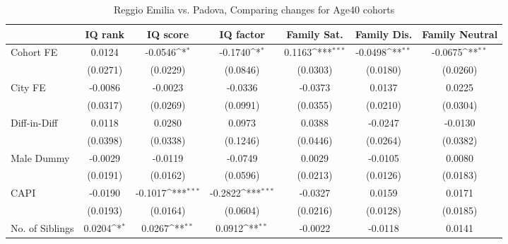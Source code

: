 \begin{table}[htbp]\centering
\def\sym#1{\ifmmode^{#1}\else\(^{#1}\)\fi}
\caption{Reggio Emilia vs. Padova, Comparing changes for Age40 cohorts}
\begin{tabular}{l*{6}{c}}
\toprule
            &\multicolumn{1}{c}{IQ rank}&\multicolumn{1}{c}{IQ score}&\multicolumn{1}{c}{IQ factor}&\multicolumn{1}{c}{Family Sat.}&\multicolumn{1}{c}{Family Dis.}&\multicolumn{1}{c}{Family Neutral}\\
\midrule
Cohort FE   &      0.0124         &     -0.0546\sym{*}  &     -0.1740\sym{*}  &      0.1163\sym{***}&     -0.0498\sym{**} &     -0.0675\sym{**} \\
            &    (0.0271)         &    (0.0229)         &    (0.0846)         &    (0.0303)         &    (0.0180)         &    (0.0260)         \\
\addlinespace
City FE     &     -0.0086         &     -0.0023         &     -0.0336         &     -0.0373         &      0.0137         &      0.0225         \\
            &    (0.0317)         &    (0.0269)         &    (0.0991)         &    (0.0355)         &    (0.0210)         &    (0.0304)         \\
\addlinespace
Diff-in-Diff&      0.0118         &      0.0280         &      0.0973         &      0.0388         &     -0.0247         &     -0.0130         \\
            &    (0.0398)         &    (0.0338)         &    (0.1246)         &    (0.0446)         &    (0.0264)         &    (0.0382)         \\
\addlinespace
Male Dummy  &     -0.0029         &     -0.0119         &     -0.0749         &      0.0029         &     -0.0105         &      0.0080         \\
            &    (0.0191)         &    (0.0162)         &    (0.0596)         &    (0.0213)         &    (0.0126)         &    (0.0183)         \\
\addlinespace
CAPI        &     -0.0190         &     -0.1017\sym{***}&     -0.2822\sym{***}&     -0.0327         &      0.0159         &      0.0171         \\
            &    (0.0193)         &    (0.0164)         &    (0.0604)         &    (0.0216)         &    (0.0128)         &    (0.0185)         \\
\addlinespace
No. of Siblings&      0.0204\sym{*}  &      0.0267\sym{**} &      0.0912\sym{**} &     -0.0022         &     -0.0118         &      0.0141         \\

\end{tabular}
\end{table}
